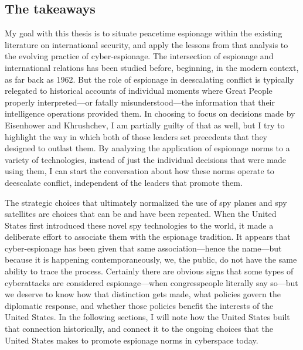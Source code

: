 \documentclass{report}
\begin{document}
\subsection{The takeaways}
My goal with this thesis is to situate peacetime espionage within the existing literature on international security, and apply the lessons from that analysis to the evolving practice of cyber-espionage. The intersection of espionage and international relations has been studied before, beginning, in the modern context, as far back as 1962. But the role of espionage in deescalating conflict is typically relegated to historical accounts of individual moments where Great People properly interpreted---or fatally misunderstood---the information that their intelligence operations provided them. In choosing to focus on decisions made by Eisenhower and Khrushchev, I am partially guilty of that as well, but I try to highlight the way in which both of those leaders set precedents that they designed to outlast them. By analyzing the application of espionage norms to a variety of technologies, instead of just the individual decisions that were made using them, I can start the conversation about how these norms operate to deescalate conflict, independent of the leaders that promote them.

The strategic choices that ultimately normalized the use of spy planes and spy satellites are choices that can be and have been repeated. When the United States first introduced these novel spy technologies to the world, it made a deliberate effort to associate them with the espionage tradition. It appears that cyber-espionage has been given that same association---hence the name---but because it is happening contemporaneously, we, the public, do not have the same ability to trace the process. Certainly there are obvious signs that some types of cyberattacks are considered espionage---when congresspeople literally say so---but we deserve to know how that distinction gets made, what policies govern the diplomatic response, and whether those policies benefit the interests of the United States. In the following sections, I will note how the United States built that connection historically, and connect it to the ongoing choices that the United States makes to promote espionage norms in cyberspace today.
\end{document}
